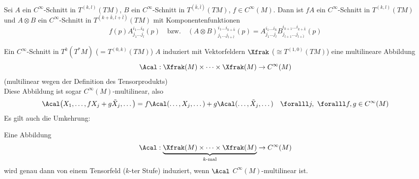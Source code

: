 \begin{lem}
	Sei $ A $ ein $C^\infty$-Schnitt in $T^{(k,l)}(TM)$, $B$ ein $C^\infty$-Schnitt in $T^{\left(\bar{k},\bar{l}\right)}(TM)$, $f \in C^\infty(M)$. Dann ist $ fA $ ein $C^\infty$-Schnitt in $T^{(k,l)}(TM)$ und $ A \otimes B $ ein $C^\infty$-Schnitt in $T^{\left(k + \bar{k},l + \bar{l}\right)}(TM)$ mit Komponentenfunktionen
	\[ f(p)A_{j_1\dots j_l}^{i_1\dots i_k}(p) \quad \text{bzw.} \quad
	(A \otimes B)_{j_1\dots j_{l+\bar{l}}}^{i_1\dots i_{k+\bar{k}}}(p) = A_{j_1\dots j_l}^{i_1\dots i_k} B_{j_{l+1}\dots j_{l+\hat{l}}}^{i_{k+1}\dots i_{k+\hat{k}}}(p) \]
\end{lem}

\begin{rem*}
	Ein $C^\infty$-Schnitt in $T^k(T^*M)$ ($ = T^{(0,k)}(TM) $) $A$ induziert mit Vektorfeldern $\Xfrak$ ($\cong T^{(1,0)}(TM)$) eine multilineare Abbildung
	\[ \Acal: \Xfrak(M) \times \dots \times \Xfrak(M) \to C^\infty(M) \]
	(multilinear wegen der Definition des Tensorprodukts)\\
	Diese Abbildung ist sogar $C^\infty (M)$-multilinear, also
	\[ \Acal \big( X_1,\dotsc, fX_j + g\tilde{X}_j,\dotsc \big) = f\Acal (\dotsc,X_j,\dotsc) + g\Acal(\dotsc,\tilde{X}_j,\dotsc) \quad \foralll j,\ \foralll f,g \in C^\infty(M) \]
	Es gilt auch die Umkehrung:
\end{rem*}

\begin{lem}\label{4.7}
	Eine Abbildung 
	\[ \Acal: \underbrace{\Xfrak(M) \times \dots \times \Xfrak(M)}_{k\text{-mal}} \to C^\infty(M) \]
	wird genau dann von einem Tensorfeld ($k$-ter Stufe) induziert, wenn $\Acal$ $C^\infty(M)$-multilinear ist.
\end{lem}

